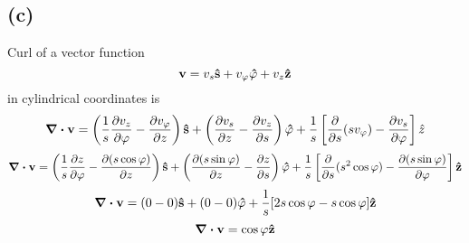 \subsection*{(c)}
Curl of a vector function 
\[\vb{v}=v_s\vu{s}+v_{\varphi}\vu{\varphi}+v_z\vu{z}\]  in cylindrical coordinates is \[\div{\vb{v}}=\left(\frac{1}{s}\pdv{v_z}{\varphi}-\pdv{v_{\varphi}}{z} \right )\vu{s}+\left(\pdv{v_s}{z}-\pdv{v_{z}}{s} \right )\vu{\varphi}+\frac{1}{s}\left[ \pdv{s}(s{v_{\varphi}})-\frac{\partial{v_s}}{\partial{\varphi}}\right ]\hat{z}\]
\[\div{\vb{v}}=\left(\frac{1}{s}\frac{\partial{z}}{\partial{\varphi}}-\frac{\partial{(s\cos{\varphi})}}{\partial{z}} \right )\vu{s}+\left(\frac{\partial{(s\sin{\varphi})}}{\partial{z}}-\frac{\partial{z}}{\partial{s}} \right )\vu{\varphi}+\frac{1}{s}\left[ \frac{\partial}{\partial{s}}(s^2\cos{\varphi})-\frac{\partial{(s\sin{\varphi})}}{\partial{\varphi}}\right ]\vu{z}\]
\[\div{\vb{v}}=(0-0)\vu{s}+(0-0)\vu{\varphi}+\frac{1}{s}[ 2s\cos{\varphi}-s\cos{\varphi} ]\vu{z}\]
\[\div{\vb{v}}=\cos{\varphi}\vu{z}\]